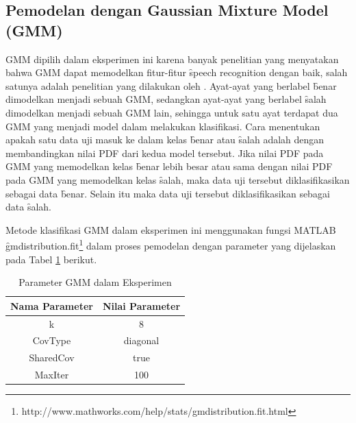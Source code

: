   \subsection{Pemodelan dengan Gaussian Mixture Model (GMM)}
  GMM dipilih dalam eksperimen ini karena banyak penelitian yang menyatakan bahwa GMM dapat memodelkan fitur-fitur \f{speech recognition} dengan baik, salah satunya adalah penelitian yang dilakukan oleh \cite{zahra2013unique}. Ayat-ayat yang berlabel \f{benar} dimodelkan menjadi sebuah GMM, sedangkan ayat-ayat yang berlabel \f{salah} dimodelkan menjadi sebuah GMM lain, sehingga untuk satu ayat terdapat dua GMM yang menjadi model dalam melakukan klasifikasi. Cara menentukan apakah satu data uji masuk ke dalam kelas \f{benar} atau \f{salah} adalah dengan membandingkan nilai PDF dari kedua model tersebut. Jika nilai PDF pada GMM yang memodelkan kelas \f{benar} lebih besar atau sama dengan nilai PDF pada GMM yang memodelkan kelas \f{salah}, maka data uji tersebut diklasifikasikan sebagai data \f{benar}. Selain itu maka data uji tersebut diklasifikasikan sebagai data \f{salah}.

  Metode klasifikasi GMM dalam eksperimen ini menggunakan fungsi MATLAB \f{gmdistribution.fit}\footnote{http://www.mathworks.com/help/stats/gmdistribution.fit.html} dalam proses pemodelan dengan parameter yang dijelaskan pada Tabel \ref{table:parametergmm} berikut.

  \begin{table}
    \centering
    \caption{Parameter GMM dalam Eksperimen}
    \begin{tabular}{|c|c|}
      \hline
      \textbf{Nama Parameter} & \textbf{Nilai Parameter} \\ \hline
      k & 8 \\ \hline
      CovType & diagonal \\ \hline
      SharedCov & true \\ \hline
      MaxIter & 100 \\ \hline
    \end{tabular}
    \label{table:parametergmm}
  \end{table}



